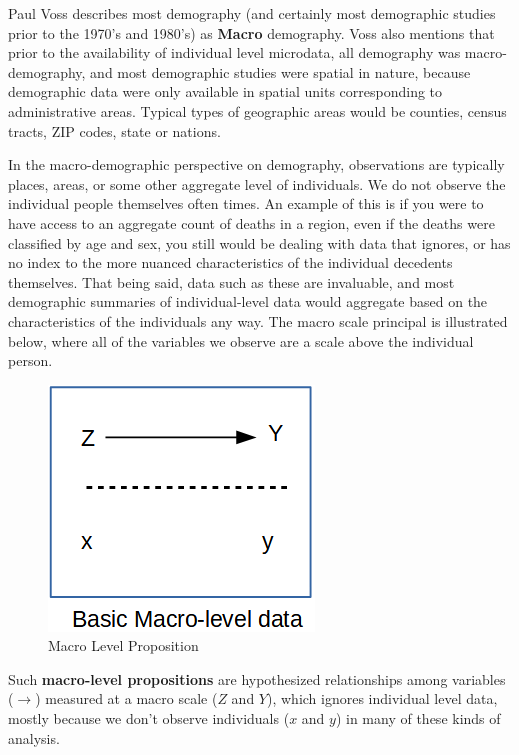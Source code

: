 \documentclass[
]{article}
\begin{document}
Paul Voss \citeyearpar{voss_demography_2007} describes most demography (and certainly most demographic studies prior to the 1970's and 1980's) as \textbf{Macro} demography. Voss also mentions that prior to the availability of individual level microdata, all demography was macro-demography, and most demographic studies were spatial in nature, because demographic data were only available in spatial units corresponding to administrative areas. Typical types of geographic areas would be counties, census tracts, ZIP codes, state or nations.

In the macro-demographic perspective on demography, observations are typically places, areas, or some other aggregate level of individuals. We do not observe the individual people themselves often times. An example of this is if you were to have access to an aggregate count of deaths in a region, even if the deaths were classified by age and sex, you still would be dealing with data that ignores, or has no index to the more nuanced characteristics of the individual decedents themselves. That being said, data such as these are invaluable, and most demographic summaries of individual-level data would aggregate based on the characteristics of the individuals any way. The macro scale principal is illustrated below, where all of the variables we observe are a scale above the individual person.

\begin{figure}
\centering
\includegraphics{images/macro2.png}
\caption{Macro Level Proposition}
\end{figure}

Such \textbf{macro-level propositions} are hypothesized relationships among variables (\(\rightarrow\)) measured at a macro scale (\(Z\) and \(Y\)), which ignores individual level data, mostly because we don't observe individuals (\(x\) and \(y\)) in many of these kinds of analysis.
\end{document}
